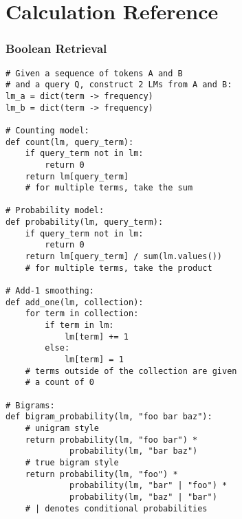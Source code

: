 \part{Calculation Reference}

\section{Boolean Retrieval}
\begin{lstlisting}
# Given a sequence of tokens A and B
# and a query Q, construct 2 LMs from A and B:
lm_a = dict(term -> frequency)
lm_b = dict(term -> frequency)

# Counting model:
def count(lm, query_term):
    if query_term not in lm:
        return 0
    return lm[query_term]
    # for multiple terms, take the sum

# Probability model:
def probability(lm, query_term):
    if query_term not in lm:
        return 0
    return lm[query_term] / sum(lm.values())
    # for multiple terms, take the product

# Add-1 smoothing:
def add_one(lm, collection):
    for term in collection:
        if term in lm:
            lm[term] += 1
        else:
            lm[term] = 1
    # terms outside of the collection are given
    # a count of 0

# Bigrams:
def bigram_probability(lm, "foo bar baz"):
    # unigram style
    return probability(lm, "foo bar") *
             probability(lm, "bar baz")
    # true bigram style
    return probability(lm, "foo") *
             probability(lm, "bar" | "foo") *
             probability(lm, "baz" | "bar")
    # | denotes conditional probabilities
\end{lstlisting}

